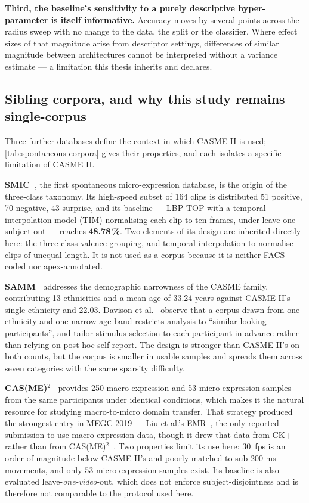 \textbf{Third, the baseline's sensitivity to a purely descriptive hyper-parameter is itself informative.} Accuracy moves by several points across the radius sweep with no change to the data, the split or the classifier. Where effect sizes of that magnitude arise from descriptor settings, differences of similar magnitude between architectures cannot be interpreted without a variance estimate --- a limitation this thesis inherits and declares.

\subsection{Sibling corpora, and why this study remains single-corpus}
\label{sec:sibling-corpora}

Three further databases define the context in which CASME II is used; \autoref{tab:spontaneous-corpora} gives their properties, and each isolates a specific limitation of CASME II.

\textbf{SMIC~\cite{liX2013}}, the first spontaneous micro-expression database, is the origin of the three-class taxonomy. Its high-speed subset of 164 clips is distributed 51 positive, 70 negative, 43 surprise, and its baseline --- LBP-TOP with a temporal interpolation model (TIM) normalising each clip to ten frames, under leave-one-subject-out --- reaches \textbf{48.78\,\%}. Two elements of its design are inherited directly here: the three-class valence grouping, and temporal interpolation to normalise clips of unequal length. It is not used as a corpus because it is neither FACS-coded nor apex-annotated.

\textbf{SAMM~\cite{davison2018}} addresses the demographic narrowness of the CASME family, contributing 13 ethnicities and a mean age of 33.24 years against CASME II's single ethnicity and 22.03. Davison et al.~\cite{davison2018} observe that a corpus drawn from one ethnicity and one narrow age band restricts analysis to ``similar looking participants'', and tailor stimulus selection to each participant in advance rather than relying on post-hoc self-report. The design is stronger than CASME II's on both counts, but the corpus is smaller in usable samples and spreads them across seven categories with the same sparsity difficulty.

\textbf{CAS(ME)$^2$~\cite{qu2016}} provides 250 macro-expression and 53 micro-expression samples from the same participants under identical conditions, which makes it the natural resource for studying macro-to-micro domain transfer. That strategy produced the strongest entry in MEGC 2019 --- Liu et al.'s EMR~\cite{liu2019}, the only reported submission to use macro-expression data, though it drew that data from CK+ rather than from CAS(ME)$^2$~\cite{see2019}. Two properties limit its use here: 30~fps is an order of magnitude below CASME II's and poorly matched to sub-200-ms movements, and only 53 micro-expression samples exist. Its baseline is also evaluated leave-\textit{one-video}-out, which does not enforce subject-disjointness and is therefore not comparable to the protocol used here.

